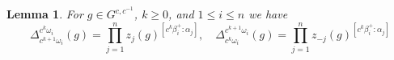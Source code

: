 \documentclass[12pt]{amsart}
\newcommand{\saySS}[1]{\say[SS]{\color{blue}{\bf SS:}\;#1}}
\newtheorem{lemma}[theorem]{Lemma}
\theoremstyle{remark}
\numberwithin{equation}{section}
\begin{document}

\begin{lemma}
  \label{lemma:coefficient_identity_powers}
For $g \in G^{c,c^{-1}}$, $k \geq 0$, and $1 \leq i \leq n$ we have
\begin{equation*}
    \Delta_{c^{k+1} \omega_i}^{c^k \omega_i}(g)
    =
    \prod_{j=1}^nz_j(g)^{[c^k\beta_i^+:\alpha_j]},\quad 
    \Delta_{c^k \omega_i}^{c^{k+1} \omega_i}(g)
    =
    \prod_{j=1}^nz_{-j}(g)^{[c^k\beta_i^+:\alpha_j]}
\end{equation*}

\end{lemma}
\end{document}
